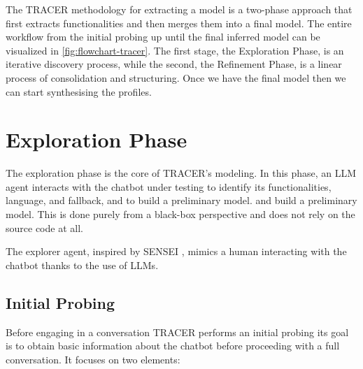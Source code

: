 The \ac{TRACER} methodology for extracting a model is a two-phase approach
that first extracts functionalities and then merges them into a final model.
The entire workflow from the initial probing up until the final inferred model
can be visualized in \autoref{fig:flowchart-tracer}.
The first stage, the Exploration Phase, is an iterative discovery process,
while the second, the Refinement Phase, is a linear process of consolidation and structuring.
Once we have the final model then we can start synthesising the profiles.


\section{Exploration Phase}\label{sec:exploration}

The exploration phase is the core of \ac{TRACER}'s modeling.
In this phase, an \ac{LLM} agent interacts with the chatbot under testing
to identify its functionalities, language, and fallback, and to build a preliminary model.
and build a preliminary model.
This is done purely from a black-box perspective
and does not rely on the source code at all.

The explorer agent, inspired by SENSEI
\autocite{delaraSensei, delaraAutomatedEndtoEndTesting2025},
mimics a human interacting with the chatbot
thanks to the use of \acp{LLM}.



\subsection{Initial Probing}

Before engaging in a conversation
\ac{TRACER} performs an initial probing
its goal is to obtain basic information
about the chatbot before proceeding with a full conversation.
It focuses on two elements:

